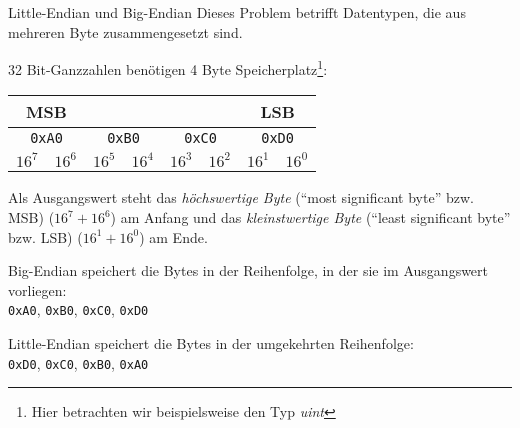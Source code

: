 \begin{example}{Little-Endian und Big-Endian}
    Dieses Problem betrifft Datentypen, die aus mehreren Byte zusammengesetzt sind.
    
    32 Bit-Ganzzahlen benötigen 4 Byte Speicherplatz\footnote{Hier betrachten wir beispielsweise den Typ \emph{uint}}:
    
    \begin{center}
        \begin{tabular}{|cc|cc|cc|cc|}
            \multicolumn{2}{c}{\textbf{MSB}}   & \multicolumn{4}{c}{}               & \multicolumn{2}{c}{\textbf{LSB}}                                                                             \\\hline
            \multicolumn{2}{|c}{\texttt{0xA0}} & \multicolumn{2}{|c}{\texttt{0xB0}} & \multicolumn{2}{|c}{\texttt{0xC0}} & \multicolumn{2}{|c|}{\texttt{0xD0}}                                     \\\hline
            $16^7$                             & $16^6$                             & $16^5$                             & $16^4$                              & $16^3$ & $16^2$ & $16^1$ & $16^0$ \\\hline
        \end{tabular}
    \end{center}
    
    Als Ausgangswert steht das \emph{höchswertige Byte} (\enquote{most significant byte} bzw. MSB) ($16^7 + 16^6$) am Anfang und das \emph{kleinstwertige Byte} (\enquote{least significant byte} bzw. LSB) ($16^1 + 16^0$) am Ende.
    
    Big-Endian speichert die Bytes in der Reihenfolge, in der sie im Ausgangswert vorliegen:\\
    \texttt{0xA0}, \texttt{0xB0}, \texttt{0xC0}, \texttt{0xD0}
    
    Little-Endian speichert die Bytes in der umgekehrten Reihenfolge:\\
    \texttt{0xD0}, \texttt{0xC0}, \texttt{0xB0}, \texttt{0xA0}
\end{example}

